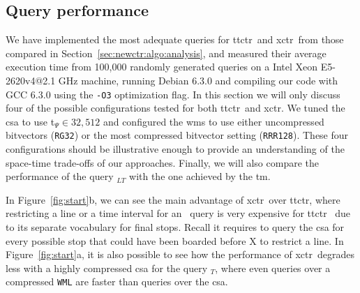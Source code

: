     \subsection{Query performance}
    \label{sec:newctr:exp:time}
    We have implemented the most adequate queries for \gls{ttctr}~and \gls{xctr}~from those compared in Section~\ref{sec:newctr:algo:analysis}, and measured their average execution time from 100,000 randomly generated queries on a Intel Xeon E5-2620v4@2.1 GHz machine, running Debian 6.3.0 and compiling our code with GCC 6.3.0 using the \texttt{-O3} optimization flag. In this section we will only discuss four of the possible configurations tested for both \gls{ttctr}~and \gls{xctr}. We tuned the \gls{csa} to use t$_{\Psi} \in {32,512}$ and configured the \gls{wm}s to use either uncompressed bitvectors (\texttt{RG32}) or the most compressed bitvector setting (\texttt{RRR128}). These four configurations should be illustrative enough to provide an understanding of the space-time trade-offs of our approaches. Finally, we will also compare the performance of the query \boardX$_{LT}$ with the one achieved by the \gls{tm}.
    
    In Figure~\ref{fig:start}b, we can see the main advantage of \gls{xctr}~over \gls{ttctr}, where restricting a line or a time interval for an \endX~query is very expensive for \gls{ttctr}~ due to its separate vocabulary for final stops. Recall it requires to query the \gls{csa} for every possible stop that could have been boarded before X to restrict a line. In Figure~\ref{fig:start}a, it is also possible to see how the performance of \gls{xctr}~degrades less with a highly compressed \gls{csa} for the query \startX$_T$, where even queries over a compressed \texttt{WML} are faster than queries over the \gls{csa}.
    

